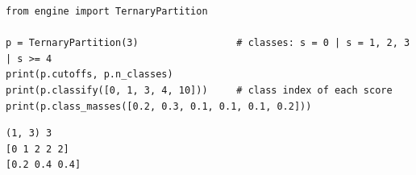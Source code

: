 \begin{lstlisting}[style=code]
from engine import TernaryPartition

p = TernaryPartition(3)                 # classes: s = 0 | s = 1, 2, 3 | s >= 4
print(p.cutoffs, p.n_classes)
print(p.classify([0, 1, 3, 4, 10]))     # class index of each score
print(p.class_masses([0.2, 0.3, 0.1, 0.1, 0.1, 0.2]))
\end{lstlisting}
\begin{lstlisting}[style=output]
(1, 3) 3
[0 1 2 2 2]
[0.2 0.4 0.4]
\end{lstlisting}
